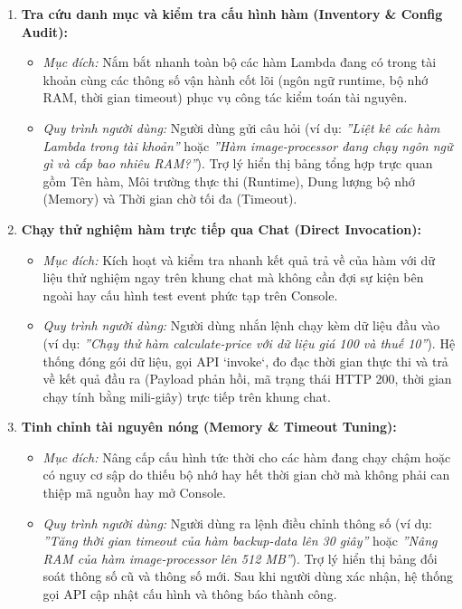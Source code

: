 \documentclass[a4paper,12pt]{article}
\begin{document}
\begin{enumerate}
  \item \textbf{Tra cứu danh mục và kiểm tra cấu hình hàm (Inventory \& Config Audit):}
  \begin{itemize}
    \item \textit{Mục đích:} Nắm bắt nhanh toàn bộ các hàm Lambda đang có trong tài khoản cùng các thông số vận hành cốt lõi (ngôn ngữ runtime, bộ nhớ RAM, thời gian timeout) phục vụ công tác kiểm toán tài nguyên.
    \item \textit{Quy trình người dùng:} Người dùng gửi câu hỏi (ví dụ: \textit{''Liệt kê các hàm Lambda trong tài khoản''} hoặc \textit{''Hàm image-processor đang chạy ngôn ngữ gì và cấp bao nhiêu RAM?''}). Trợ lý hiển thị bảng tổng hợp trực quan gồm Tên hàm, Môi trường thực thi (Runtime), Dung lượng bộ nhớ (Memory) và Thời gian chờ tối đa (Timeout).
  \end{itemize}

  \item \textbf{Chạy thử nghiệm hàm trực tiếp qua Chat (Direct Invocation):}
  \begin{itemize}
    \item \textit{Mục đích:} Kích hoạt và kiểm tra nhanh kết quả trả về của hàm với dữ liệu thử nghiệm ngay trên khung chat mà không cần đợi sự kiện bên ngoài hay cấu hình test event phức tạp trên Console.
    \item \textit{Quy trình người dùng:} Người dùng nhắn lệnh chạy kèm dữ liệu đầu vào (ví dụ: \textit{''Chạy thử hàm calculate-price với dữ liệu giá 100 và thuế 10''}). Hệ thống đóng gói dữ liệu, gọi API `invoke`, đo đạc thời gian thực thi và trả về kết quả đầu ra (Payload phản hồi, mã trạng thái HTTP 200, thời gian chạy tính bằng mili-giây) trực tiếp trên khung chat.
  \end{itemize}

  \item \textbf{Tinh chỉnh tài nguyên nóng (Memory \& Timeout Tuning):}
  \begin{itemize}
    \item \textit{Mục đích:} Nâng cấp cấu hình tức thời cho các hàm đang chạy chậm hoặc có nguy cơ sập do thiếu bộ nhớ hay hết thời gian chờ mà không phải can thiệp mã nguồn hay mở Console.
    \item \textit{Quy trình người dùng:} Người dùng ra lệnh điều chỉnh thông số (ví dụ: \textit{''Tăng thời gian timeout của hàm backup-data lên 30 giây''} hoặc \textit{''Nâng RAM của hàm image-processor lên 512 MB''}). Trợ lý hiển thị bảng đối soát thông số cũ và thông số mới. Sau khi người dùng xác nhận, hệ thống gọi API cập nhật cấu hình và thông báo thành công.
  \end{itemize}


\end{enumerate}
\end{document}
